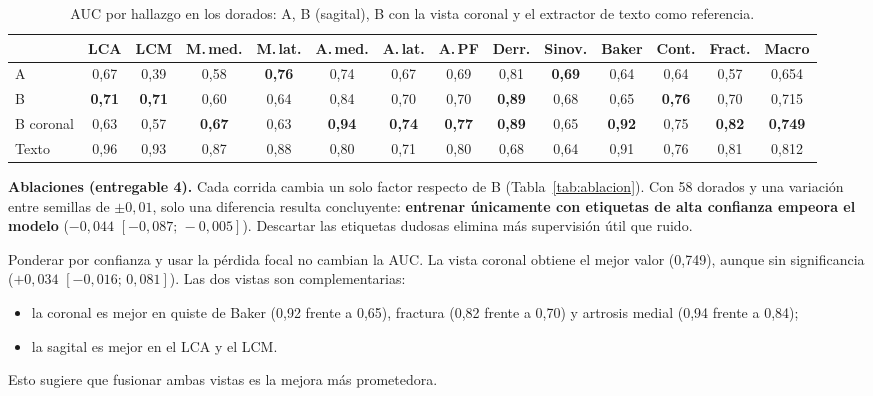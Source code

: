 \begin{table}[t]
  \caption{AUC por hallazgo en los dorados: A, B (sagital), B con la vista coronal y el
    extractor de texto como referencia.}
  \label{tab:perlabel}
  \centering
  \footnotesize
  \setlength{\tabcolsep}{2.3pt}
  \begin{tabular}{lcccccccccccc|c}
    \toprule
    & LCA & LCM & M.\,med. & M.\,lat. & A.\,med. & A.\,lat. & A.\,PF & Derr. & Sinov. & Baker & Cont. & Fract. & Macro \\
    \midrule
    A             & 0,67 & 0,39 & 0,58 & \textbf{0,76} & 0,74 & 0,67 & 0,69 & 0,81 & \textbf{0,69} & 0,64 & 0,64 & 0,57 & 0,654 \\
    B             & \textbf{0,71} & \textbf{0,71} & 0,60 & 0,64 & 0,84 & 0,70 & 0,70 & \textbf{0,89} & 0,68 & 0,65 & \textbf{0,76} & 0,70 & 0,715 \\
    B coronal     & 0,63 & 0,57 & \textbf{0,67} & 0,63 & \textbf{0,94} & \textbf{0,74} & \textbf{0,77} & \textbf{0,89} & 0,65 & \textbf{0,92} & 0,75 & \textbf{0,82} & \textbf{0,749} \\
    \midrule
    Texto         & 0,96 & 0,93 & 0,87 & 0,88 & 0,80 & 0,71 & 0,80 & 0,68 & 0,64 & 0,91 & 0,76 & 0,81 & 0,812 \\
    \bottomrule
  \end{tabular}
\end{table}

\textbf{Ablaciones (entregable 4).} Cada corrida cambia un solo factor respecto de B
(Tabla~\ref{tab:ablacion}). Con 58 dorados y una variación entre semillas de $\pm0{,}01$, solo
una diferencia resulta concluyente: \textbf{entrenar únicamente con etiquetas de alta
confianza empeora el modelo} ($-0{,}044$ $[-0{,}087;\,-0{,}005]$). Descartar las etiquetas
dudosas elimina más supervisión útil que ruido.

Ponderar por confianza y usar la pérdida focal no cambian la AUC. La vista coronal obtiene el
mejor valor (0,749), aunque sin significancia ($+0{,}034$ $[-0{,}016;\,0{,}081]$). Las dos vistas
son complementarias:
\begin{itemize}
  \item la coronal es mejor en quiste de Baker (0,92 frente a 0,65), fractura (0,82 frente a
        0,70) y artrosis medial (0,94 frente a 0,84);
  \item la sagital es mejor en el LCA y el LCM.
\end{itemize}
Esto sugiere que fusionar ambas vistas es la mejora más prometedora.

